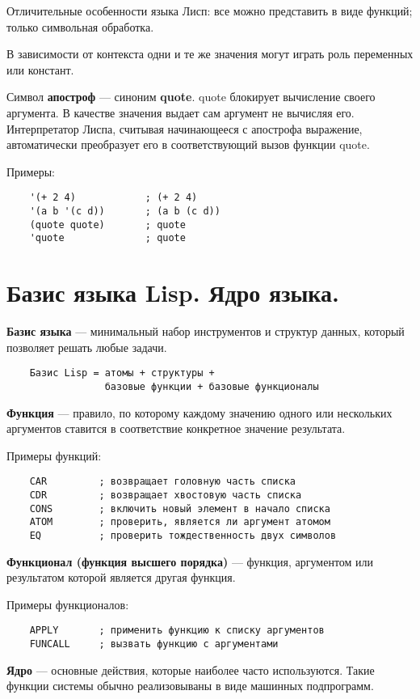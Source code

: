 Отличительные особенности языка Лисп: все можно представить в виде функций; только символьная обработка.

В зависимости от контекста одни и те же значения могут играть роль переменных или констант.  

Символ \textbf{апостроф} --- синоним \textbf{quote}.
quote блокирует вычисление своего аргумента. В качестве значения выдает сам аргумент не вычисляя его. Интерпретатор Лиспа, считывая начинающееся с апострофа выражение, автоматически преобразует его в соответствующий вызов функции quote. 

Примеры:
\begin{lstlisting}
    '(+ 2 4)            ; (+ 2 4)
    '(a b '(c d))       ; (a b (c d))
    (quote quote)       ; quote
    'quote              ; quote
\end{lstlisting}

\section{Базис языка Lisp. Ядро языка.}

\textbf{Базис языка} --- минимальный набор инструментов и структур данных, который позволяет решать любые задачи.

\begin{lstlisting}
    Базис Lisp = атомы + структуры + 
                 базовые функции + базовые функционалы
\end{lstlisting}

\textbf{Функция} --- правило, по которому каждому значению одного или нескольких аргументов ставится в соответствие конкретное значение результата.

Примеры функций:
\begin{lstlisting}
    CAR         ; возвращает головную часть списка
    CDR         ; возвращает хвостовую часть списка
    CONS        ; включить новый элемент в начало списка
    ATOM        ; проверить, является ли аргумент атомом
    EQ          ; проверить тождественность двух символов
\end{lstlisting}

\textbf{Функционал (функция высшего порядка)} --- функция, аргументом или результатом которой является другая функция.

Примеры функционалов:
\begin{lstlisting}
    APPLY       ; применить функцию к списку аргументов
    FUNCALL     ; вызвать функцию с аргументами
\end{lstlisting} 

\textbf{Ядро} --- основные действия, которые наиболее часто используются. Такие функции системы обычно реализовываны в виде машинных подпрограмм.




